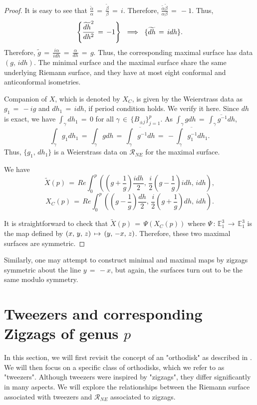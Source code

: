 \documentclass[12pt,epsfig,tikz,multi]{amsart}
\numberwithin{equation}{section}
\begin{document}
\begin{proof}
It is easy to see that $\frac{\widetilde{\alpha}}{\alpha} \,=\, \frac{\widetilde{\beta}}{\beta} \,=\,
 i $. Therefore, $\frac{\widetilde{\alpha}\widetilde{\beta}}{\alpha\beta} \,=\, -1$. Thus,
    $$\left\{\frac{\widetilde{dh}^2}{dh^2} \,=\, -1\right\} \,\,\implies\,\, \{\widetilde{dh} \,=\,  i  dh\color{black}\}.$$
Therefore, $\widetilde{g} \,=\, \frac{ i \alpha}{ i  dh}
\,=\, \frac{\alpha}{dh} \,=\, g$. Thus, the corresponding maximal surface has data $(g,\,  i  dh)$.
The minimal surface and the maximal surface share the same underlying Riemann surface, and they have
at most eight conformal and anticonformal isometries.

Companion of $X$, which is denoted by $X_C$, is given by the Weierstrass data as $g_1 \,=\, -
 i  g$ and $dh_1 \,=\,  i  dh$, if 
period condition holds.  We verify it here. Since $dh$ is exact, we have $\int_\gamma dh_1 \,=\, 0$ for all 
$\gamma \,\in\, \lbrace B_{\pm j} \rbrace_{j=1}^{p}$. As $\int_\gamma gdh \,=\, \overline{\int_\gamma g^{-1}dh}$, 
$$\int_{\gamma}g_1dh_1 \,= \,\int_\gamma gdh \,=\, \overline{\int_\gamma g^{-1}dh} \,=\, 
-\overline{\int_{\gamma}g_1^{-1}dh_1}.$$ Thus, $\lbrace g_1,\, dh_1 \rbrace$ is a Weierstrass 
data on $\mathcal{R}_{NE}$ for the maximal surface.

We have 
$$\widetilde{X}(p) \,=\, Re\int_{0}^p((g+\frac{1}{g})\frac{ i dh}{2},\,\frac{ i }{2}(g-
\frac{1}{g}){ i dh},\, i dh),$$
$$X_C(p) \,=\, Re\int_{0}^p((g-\frac{1}{g})\frac{dh}{2},\,\frac{ i }{2}(g+\frac{1}{g})dh,\, i dh).$$

It is straightforward to check that $\widetilde{X}(p) \,= \,\Psi(X_C(p))$ where $\Psi\,:\,
\mathbb{E}^3_1\,\longrightarrow\, \mathbb{E}^3_1$ is the map defined by $(x,\,y,\,z)
\,\mapsto\color{black}\, (y,\,-x,\,z)$. Therefore, these two maximal surfaces are symmetric.
\end{proof}

Similarly, one may attempt to construct minimal and maximal maps by zigzags symmetric about the line $y\,=\,-x$, 
but again, the surfaces turn out to be the same modulo symmetry.

\section{\textbf{Tweezers  and corresponding Zigzags of genus $p$}}

In this section, we will first revisit the concept of an "orthodisk" as described in \cite{Weber1998TeichmullerTA}. 
We will then focus on a specific class of orthodisks, which we refer to as "tweezers". Although tweezers were 
inspired by "zigzags", they differ significantly in many aspects. We will explore the 
relationships between the Riemann surface associated with tweezers and $\mathcal{R}_{NE}$ associated to
zigzags.
\end{document}
